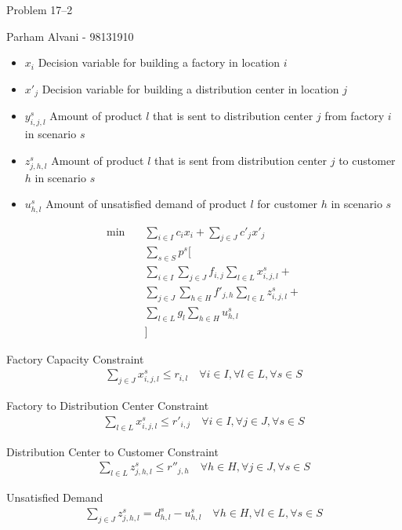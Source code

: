\documentclass{article}
\begin{document}
{\Large Problem 17--2
        \hfill}

\begin{center}
{\Large Parham Alvani - 98131910}
\end{center}
\vspace{0.05in}

\begin{itemize}
        \item \(x_{i}\) Decision variable for building a factory in location \(i\)
        \item \(x'_{j}\) Decision variable for building a distribution center in location \(j\)
        \item \(y_{i,j,l}^{s}\) Amount of product \(l\) that is sent to distribution center \(j\) from factory \(i\) in scenario \(s\)
        \item \(z_{j,h,l}^{s}\) Amount of product \(l\) that is sent from distribution center \(j\) to customer \(h\) in scenario \(s\)
        \item \(u_{h,l}^{s}\) Amount of unsatisfied demand of product \(l\) for customer \(h\) in scenario \(s\)
\end{itemize}

\begin{align*}
        \min \quad &\sum_{i \in I} c_i x_i + \sum_{j \in J} c'_j x'_j \\
        &\sum_{s \in S} p^s [ \\
        & \sum_{i \in I} \sum_{j \in J} f_{i,j} \sum_{l \in L}  x_{i,j,l}^{s} + \\
        & \sum_{j \in J} \sum_{h \in H} f'_{j,h} \sum_{l \in L}  z_{i,j,l}^{s} + \\
        & \sum_{l \in L} g_l \sum_{h \in H} u_{h,l}^{s} \\
        &]
\end{align*}

Factory Capacity Constraint
\begin{align*}
        \sum_{j \in J} x_{i,j,l}^{s} \le r_{i,l} \quad \forall i \in I, \forall l \in L, \forall s \in S
\end{align*}

Factory to Distribution Center Constraint
\begin{align*}
        \sum_{l \in L} x_{i,j,l}^{s} \le r'_{i,j} \quad \forall i \in I, \forall j \in J, \forall s \in S
\end{align*}

Distribution Center to Customer Constraint
\begin{align*}
        \sum_{l \in L} z_{j,h,l}^{s} \le r''_{j,h} \quad \forall h \in H, \forall j \in J, \forall s \in S
\end{align*}

Unsatisfied Demand
\begin{align*}
        \sum_{j \in J} z_{j,h,l}^{s} = d_{h,l}^{s} - u_{h,l}^{s} \quad \forall h \in H, \forall l \in L, \forall s \in S
\end{align*}
\end{document}
